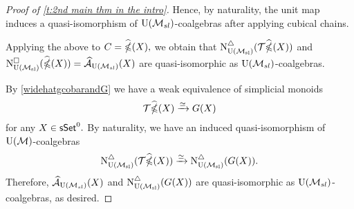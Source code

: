 \begin{proof}[Proof of \cref{t:2nd main thm in the intro}]
	
	Hence, by naturality, the unit map induces a quasi-isomorphism of $\USL$-coalgebras after applying cubical chains.
	
	Applying the above to $C= \widehat{\ccobar}(X),$ we obtain that $\schainsUSL (\mathcal{T} \widehat{\ccobar}(X))$ and $\cchainsUSL(\widehat{\ccobar}(X)) = \Ahat_{\USL}(X)$ are quasi-isomorphic as $\USL$-coalgebras.
	
	By \cref{widehatgcobarandG} we have a weak equivalence of simplicial monoids
	$$\mathcal{T}\widehat{\ccobar}(X) \xrightarrow{\simeq} G(X)$$ for any $X \in \sSet^0.$ By naturality, we have an induced quasi-isomorphism of $\UM$-coalgebras
	$$\schainsUSL(\mathcal{T}\widehat{\ccobar}(X)) \xra{\simeq} \schainsUSL(G(X)).$$
	Therefore, $\Ahat_{\USL}(X)$ and $\schainsUSL(G(X))$ are quasi-isomorphic as $\USL$-coalgebras, as desired.
\end{proof}